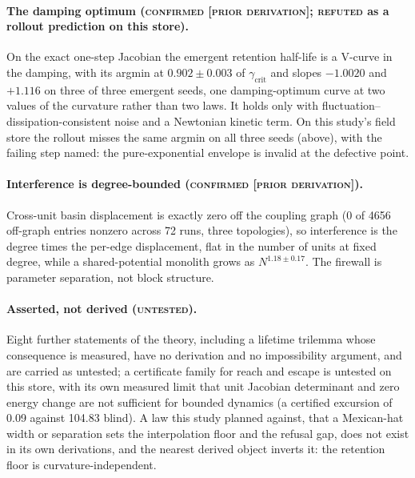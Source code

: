 \documentclass{article} %
\begin{document}
\paragraph{The damping optimum (\textsc{confirmed [prior derivation]}; \textsc{refuted} as a
rollout prediction on this store).} On the exact one-step Jacobian the emergent retention
half-life is a V-curve in the damping, with its argmin at $0.902\pm0.003$ of
$\gamma_{\text{crit}}$ and slopes $-1.0020$ and $+1.116$ on three of three emergent seeds, one
damping-optimum curve at two values of the curvature rather than two laws.
It holds only with fluctuation--dissipation-consistent noise and a Newtonian kinetic term. On
this study's field store the rollout misses the same argmin on all three seeds (above), with the
failing step named: the pure-exponential envelope is invalid at the defective point.

\paragraph{Interference is degree-bounded (\textsc{confirmed [prior derivation]}).} Cross-unit
basin displacement is exactly zero off the coupling graph (0 of 4656 off-graph entries nonzero
across 72 runs, three topologies), so interference is the degree times the per-edge displacement,
flat in the number of units at fixed degree, while a shared-potential monolith grows as
$N^{1.18\pm0.17}$. The firewall is parameter separation, not block structure.

\paragraph{Asserted, not derived (\textsc{untested}).} Eight further statements of the theory,
including a lifetime trilemma whose consequence is measured, have no derivation and no
impossibility argument, and are carried as untested; a certificate family for reach and escape is
untested on this store, with its own measured limit that unit Jacobian determinant and zero
energy change are not sufficient for bounded dynamics (a certified excursion of 0.09 against
104.83 blind). %
A law this study planned against, that a Mexican-hat width or separation sets the
interpolation floor and the refusal gap, does not exist in its own derivations, and the nearest
derived object inverts it: the retention floor is curvature-independent. %
\end{document}
